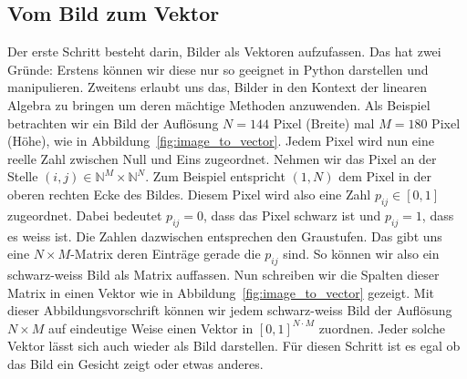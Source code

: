\subsection{Vom Bild zum Vektor}
Der erste Schritt besteht darin, Bilder als Vektoren aufzufassen.
Das hat zwei Gründe: Erstens können wir diese nur so geeignet in Python darstellen und manipulieren.
Zweitens erlaubt uns das, Bilder in den Kontext der linearen Algebra zu bringen um deren mächtige Methoden anzuwenden.
Als Beispiel betrachten wir ein Bild der Auflösung $N=144$ Pixel (Breite) mal $M=180$ Pixel (Höhe), wie in Abbildung~\ref{fig:image_to_vector}.
Jedem Pixel wird nun eine reelle Zahl zwischen Null und Eins zugeordnet.
Nehmen wir das Pixel an der Stelle $\left(i,j\right)\in\mathbb N^M\times\mathbb N^N$.
Zum Beispiel entspricht $\left(1,N\right)$ dem Pixel in der oberen rechten Ecke des Bildes.
Diesem Pixel wird also eine Zahl $p_{ij}\in\left[0,1\right]$ zugeordnet.
Dabei bedeutet $p_{ij}=0$, dass das Pixel schwarz ist und $p_{ij}=1$, dass es weiss ist.
Die Zahlen dazwischen entsprechen den Graustufen.
Das gibt uns eine $N\times M$-Matrix deren Einträge gerade die $p_{ij}$ sind.
So können wir also ein schwarz-weiss Bild als Matrix auffassen.
Nun schreiben wir die Spalten dieser Matrix in einen Vektor wie in Abbildung~\ref{fig:image_to_vector} gezeigt.
Mit dieser Abbildungsvorschrift können wir jedem schwarz-weiss Bild der Auflösung $N\times M$ auf eindeutige Weise einen Vektor in $\left[0,1\right]^{N\cdot M}$ zuordnen.
Jeder solche Vektor lässt sich auch wieder als Bild darstellen.
Für diesen Schritt ist es egal ob das Bild ein Gesicht zeigt oder etwas anderes.
